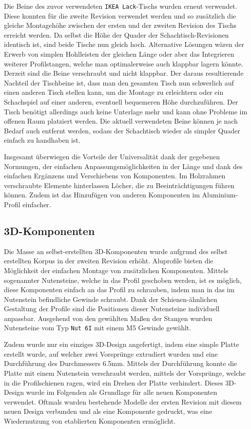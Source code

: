 Die Beine des zuvor verwendeten
\passthrough{\lstinline!IKEA Lack!}-Tischs wurden erneut verwendet.
Diese konnten für die zweite Revision verwendet werden und so zusätzlich
die gleiche Montagehöhe zwischen der ersten und der zweiten Revision des
Tischs erreicht werden. Da selbst die Höhe der Quader der
Schachtisch-Revisionen identisch ist, sind beide Tische nun gleich hoch.
Alternative Lösungen wären der Erwerb von simplen Hohlleisten der
gleichen Länge oder aber das Integrieren weiterer Profilstangen, welche
man optimalerweise auch klappbar lagern könnte. Derzeit sind die Beine
verschraubt und nicht klappbar. Der daraus resultierende Nachteil der
Tischbeine ist, dass man den gesamten Tisch nun schwerlich auf einen
anderen Tisch stellen kann, um die Montage zu erleichtern oder ein
Schachspiel auf einer anderen, eventuell bequemeren Höhe durchzuführen.
Der Tisch benötigt allerdings auch keine Unterlage mehr und kann ohne
Probleme im offenen Raum platziert werden. Die aktuell verwendeten Beine
können je nach Bedarf auch entfernt werden, sodass der Schachtisch
wieder als simpler Quader einfach zu handhaben ist.

Insgesamt überwiegen die Vorteile der Universalität dank der gegebenen
Normungen, der einfachen Anpassungsmöglichkeiten in der Länge und dank
des einfachen Ergänzens und Verschiebens von Komponenten. Im Holzrahmen
verschraubte Elemente hinterlassen Löcher, die zu Beeinträchtigungen
führen können. Zudem ist das Hinzufügen von anderen Komponenten im
Aluminium-Profil einfacher.

\hypertarget{d-komponenten}{%
\subsection{3D-Komponenten}\label{d-komponenten}}

Die Masse an selbst-erstellten 3D-Komponenten wurde aufgrund des selbst
erstellten Korpus in der zweiten Revision erhöht. Aluprofile bieten die
Möglichkeit der einfachen Montage von zusätzlichen Komponenten. Mittels
sogenannter Nutensteine, welche in das Profil geschoben werden, ist es
möglich, diese Komponenten einfach an das Profil zu schrauben, indem man
in das im Nutenstein befindliche Gewinde schraubt. Dank der
Schienen-ähnlichen Gestaltung der Profile sind die Positionen dieser
Nutensteine individuell anpassbar. Ausgehend von den gewählten Maßen der
Stangen wurden Nutensteine vom Typ \passthrough{\lstinline!Nut 6I!} mit
einem M5 Gewinde gewählt.

Zudem wurde nur ein einziges 3D-Design angefertigt, indem eine simple
Platte erstellt wurde, auf welcher zwei Vorsprünge extrudiert wurden und
eine Durchführung des Durchmessers 6.5mm. Mittels der Durchführung
konnte die Platte mit einem Nutenstein verschraubt werden, mittels der
Vorsprünge, welche in die Profilschienen ragen, wird ein Drehen der
Platte verhindert. Dieses 3D-Design wurde im Folgenden als Grundlage für
alle neuen Komponenten verwendet. Oftmals wurden bestehende Modelle der
ersten Revision mit diesem neuen Design verbunden und als eine
Komponente gedruckt, was eine Wiedernutzung von etablierten Komponenten
ermöglicht.

